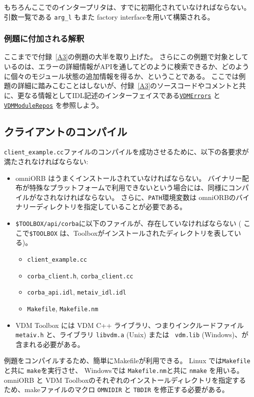 \documentclass[\pformat,12pt]{jarticle}
\newcommand{\VDMErrors}{\hyperlink{interface.VDMErrors}{VDMErrors}}
\newcommand{\VDMModuleRepos}{\hyperlink{interface.VDMModuleRepos}{VDMModuleRepos}}
\begin{document}
もちろんここでのインタープリタは、すでに初期化されていなければならない。
引数一覧である {\tt arg\_l} もまた factory interfaceを用いて構築される。

\subsubsection{例題に付加される解釈}

ここまでで付録~\ref{A3}の例題の大半を取り上げた。
さらにこの例題で対象としているのは、エラーの詳細情報がAPIを通してどのように検索できるか、どのように個々のモジュール状態の追加情報を得るか、ということである。
ここでは例題の詳細に踏みこむことはしないが、付録~\ref{A3}のソースコードやコメントと共に、更なる情報としてIDL記述のインターフェイスである{\tt \VDMErrors} と{\tt \VDMModuleRepos} を参照しよう。

\subsection{クライアントのコンパイル}

{\tt client\_example.cc}ファイルのコンパイルを成功させるために、以下の各要求が満たされなければならない: 

\begin{itemize}
\item  omniORB はうまくインストールされていなければならない。
バイナリー配布が特殊なプラットフォームで利用できないという場合には、同様にコンパイルがなされなければならない。
さらに、{\tt PATH}環境変数は omniORBのバイナリーディレクトリを指定していることが必要である。
\item 
 \texttt{\$TOOLBOX/api/corba}に以下のファイルが、存在していなければならない ( ここで\texttt{\$TOOLBOX} は、Toolboxがインストールされたディレクトリを表している)。
\begin{itemize}
\item {\tt client\_example.cc}
\item {\tt corba\_client.h}, {\tt corba\_client.cc}
\item {\tt corba\_api.idl}, {\tt metaiv\_idl.idl}
\item {\tt Makefile}, {\tt Makefile.nm}
\end{itemize}
\item
 VDM Toolbox には VDM C++ ライブラリ、つまりインクルードファイル {\tt metaiv.h} と、ライブラリ {\tt libvdm.a} (Unix) または {\tt
vdm.lib} (Windows)、が含まれる必要がある。 
\end{itemize}

例題をコンパイルするため、簡単にMakefileが利用できる。
 Linux では{\tt Makefile}と共に {\tt make}を実行させ、 Windowsでは {\tt Makefile.nm}と共に {\tt nmake} を用いる。
omniORB と VDM Toolboxのそれぞれのインストールディレクトリを指定するため、makeファイルのマクロ {\tt OMNIDIR} と {\tt TBDIR} を修正する必要がある。
\end{document}
